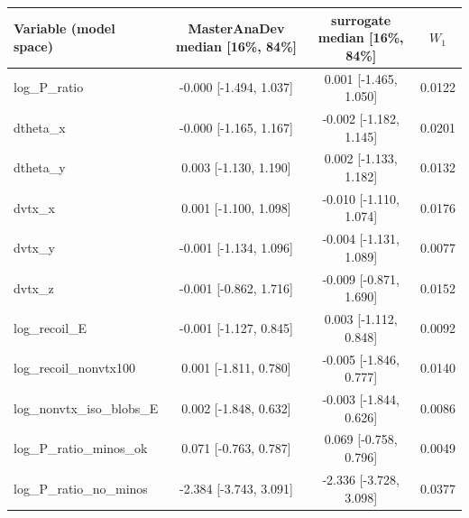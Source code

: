 \begin{tabular}{lccc}
\toprule
Variable (model space) & MasterAnaDev median [16\%, 84\%] & surrogate median [16\%, 84\%] & $W_1$ \\
\midrule
log\_P\_ratio & -0.000 [-1.494, 1.037] & 0.001 [-1.465, 1.050] & 0.0122 \\
dtheta\_x & -0.000 [-1.165, 1.167] & -0.002 [-1.182, 1.145] & 0.0201 \\
dtheta\_y & 0.003 [-1.130, 1.190] & 0.002 [-1.133, 1.182] & 0.0132 \\
dvtx\_x & 0.001 [-1.100, 1.098] & -0.010 [-1.110, 1.074] & 0.0176 \\
dvtx\_y & -0.001 [-1.134, 1.096] & -0.004 [-1.131, 1.089] & 0.0077 \\
dvtx\_z & -0.001 [-0.862, 1.716] & -0.009 [-0.871, 1.690] & 0.0152 \\
log\_recoil\_E & -0.001 [-1.127, 0.845] & 0.003 [-1.112, 0.848] & 0.0092 \\
log\_recoil\_nonvtx100 & 0.001 [-1.811, 0.780] & -0.005 [-1.846, 0.777] & 0.0140 \\
log\_nonvtx\_iso\_blobs\_E & 0.002 [-1.848, 0.632] & -0.003 [-1.844, 0.626] & 0.0086 \\
log\_P\_ratio\_minos\_ok & 0.071 [-0.763, 0.787] & 0.069 [-0.758, 0.796] & 0.0049 \\
log\_P\_ratio\_no\_minos & -2.384 [-3.743, 3.091] & -2.336 [-3.728, 3.098] & 0.0377 \\
\bottomrule
\end{tabular}
